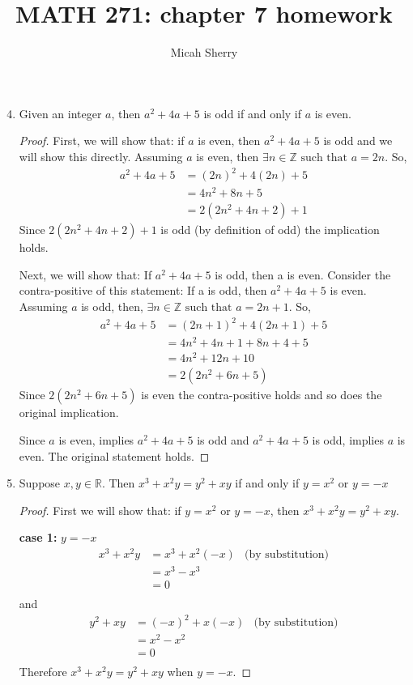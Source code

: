 \documentclass{article}
\title{MATH 271: chapter 7 homework}
\author{Micah Sherry}
\newcommand{\ints}{\mathbb{Z}}
\newcommand{\reals}{\mathbb{R}}
\newcommand{\st}{\text{ such that }}
\begin{document}
	\maketitle
	
	\begin{enumerate}
		\setcounter{enumi}{3}
		\item Given an integer $a$, then $a^2 +4a+5$ is odd if and only if $a$ is even.
		
		\begin{proof}
			First, we will show that: if $a$ is even, then $a^2 +4a+5$ is odd and we will show this directly.
			Assuming $a$ is even, then $\exists n \in \ints \st a=2n$. 
			So, 
			\begin{align*}
				a^2 + 4a + 5 &= (2n)^2 + 4(2n) + 5\\
				&= 4n^2 + 8n + 5\\
				&= 2(2n^2 + 4n + 2) + 1
			\end{align*}
			Since  $2(2n^2 + 4n + 2) + 1$ is odd (by definition of odd) the implication holds.
			
			Next, we will show that: 
			If $a^2 +4a+5$ is odd, then a is even.
			Consider the contra-positive of this statement: 
			If a is odd, then $a^2 +4a+5$ is even.
			Assuming $a$ is odd, then, $\exists n \in \ints \st a=2n+1$. 
			So, 
			\begin{align*}
				a^2 + 4a + 5 &= (2n+1)^2 + 4(2n+1) + 5\\
				&=  4n^2+4n+1 +8n + 4 + 5\\
				&=  4n^2+12n +10\\
				&=  2(2n^2+6n +5)
			\end{align*}
			Since $2(2n^2+6n +5)$ is even the contra-positive holds and so does the original implication.
			
			Since $a$ is even, implies $a^2 +4a+5$ is odd and $a^2 +4a+5$ is odd, implies $a$ is even. The original statement holds.
			
			
		\end{proof}
		
		\setcounter{enumi}{5}
		\item Suppose $x, y \in \reals $. Then  $x^3 + x^2y=y^2 +xy$ if and only if $y = x^2 $ or $y = -x$ 
		\begin{proof}
			First we will show that: if $y = x^2$ or $y = -x$, then $x^3 + x^2y=y^2 +xy$.
			
			\textbf{case 1:} $y = -x$ \\ 
			\begin{align*}
				x^3+x^2y &= x^3 + x^2(-x) & \text{(by substitution)}\\
				&=  x^3 - x^3 \\
				&= 0\\
			\end{align*}
			and
			\begin{align*}
				y^2 +xy&= (-x)^2+x(-x) & \text{(by substitution)}\\
				&=  x^2 - x^2 \\
				&= 0\\
			\end{align*}
			Therefore $x^3+x^2y = y^2 +xy$ when $y = -x$.
			

\end{proof}
\end{enumerate}
\end{document}
